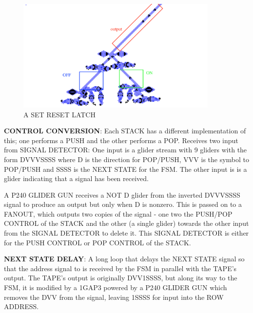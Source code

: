 \documentclass{article}
\begin{document}
\vspace{1em}

\begin{figure}[h]
\centering
\includegraphics[width=10cm,keepaspectratio]{images/SET-RESET-LATCH.png}
\captionsetup{labelformat=empty} \caption{A SET RESET LATCH}
\end{figure}

\noindent\textbf{CONTROL CONVERSION}: Each STACK has a different implementation of this; one performs a PUSH and the other performs a POP. Receives two input from SIGNAL DETECTOR: One input is a glider stream with 9 gliders with the form DVVVSSSS where D is the direction for POP/PUSH, VVV is the symbol to POP/PUSH and SSSS is the NEXT STATE for the FSM. The other input is is a glider indicating that a signal has been received.



A P240 GLIDER GUN receives a NOT D glider from the inverted DVVVSSSS signal to produce an output but only when D is nonzero. This is passed on to a FANOUT, which outputs two copies of the signal - one two the PUSH/POP CONTROL of the STACK and the other (a single glider) towards the other input from the SIGNAL DETECTOR to delete it. This SIGNAL DETECTOR is either for the PUSH CONTROL or POP CONTROL of the STACK.



\vspace{1em}

\noindent\textbf{NEXT STATE DELAY}: A long loop that delays the NEXT STATE signal so that the address signal to is received by the FSM in parallel with the TAPE's output. The TAPE's output is originally DVV1SSSS, but along its way to the FSM, it is modified by a 1GAP3 powered by a P240 GLIDER GUN which removes the DVV from the signal, leaving 1SSSS for input into the ROW ADDRESS.

\vspace{1em}
\end{document}
